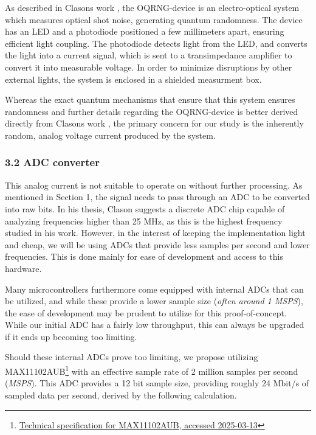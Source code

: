 As described in Clasons work \cite{Clason2023}, the OQRNG-device is an electro-optical system which measures optical shot noise, generating quantum randomness. The device has an LED and a photodiode positioned a few millimeters apart, ensuring efficient light coupling. The photodiode detects light from the LED, and converts the light into a current signal, which is sent to a transimpedance amplifier to convert it into measurable voltage. In order to minimize disruptions by other external lights, the system is enclosed in a shielded measurment box.

Whereas the exact quantum mechanisms that ensure that this system ensures randomness and further details regarding the OQRNG-device is better derived directly from Clasons work \cite{Clason2023}, the primary concern for our study is the inherently random, analog voltage current produced by the system.

\hypertarget{adc-converter}{%
\subsubsection{3.2 ADC converter}\label{adc-converter}}

This analog current is not suitable to operate on without further processing. As mentioned in Section 1, the signal needs to pass through an ADC to be converted into raw bits. In his thesis, Clason \cite{Clason2023} suggests a discrete ADC chip capable of analyzing frequencies higher than 25 MHz, as this is the highest frequency studied in his work. However, in the interest of keeping the implementation light and cheap, we will be using ADCs that provide less samples per second and lower frequencies. This is done mainly for ease of development and access to this hardware.

Many microcontrollers furthermore come equipped with internal ADCs that can be utilized, and while these provide a lower sample size (\emph{often around 1 MSPS}), the ease of development may be prudent to utilize for this proof-of-concept. While our initial ADC has a fairly low throughput, this can always be upgraded if it ends up becoming too limiting.

Should these internal ADCs prove too limiting, we propose utilizing MAX11102AUB\footnote{\href{https://www.farnell.com/datasheets/1913106.pdf}{Technical specification for MAX11102AUB, accessed 2025-03-13}} with an effective sample rate of 2 million samples per second (\emph{MSPS}). This ADC provides a 12 bit sample size, providing roughly 24 Mbit/s of sampled data per second, derived by the following calculation.

